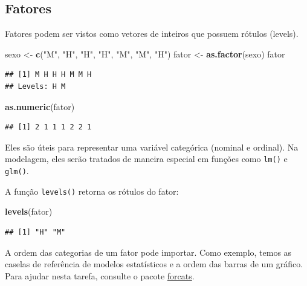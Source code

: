 \documentclass[
]{book}
\newenvironment{Shaded}{\begin{snugshade}}{\end{snugshade}}
\newcommand{\KeywordTok}[1]{\textcolor[rgb]{0.13,0.29,0.53}{\textbf{#1}}}
\newcommand{\NormalTok}[1]{#1}
\newcommand{\StringTok}[1]{\textcolor[rgb]{0.31,0.60,0.02}{#1}}
\begin{document}
\hypertarget{fatores}{%
\subsection{Fatores}\label{fatores}}

Fatores podem ser vistos como vetores de inteiros que possuem rótulos (levels).

\begin{Shaded}
\begin{Highlighting}[]
\NormalTok{sexo <{-}}\StringTok{ }\KeywordTok{c}\NormalTok{(}\StringTok{"M"}\NormalTok{, }\StringTok{"H"}\NormalTok{, }\StringTok{"H"}\NormalTok{, }\StringTok{"H"}\NormalTok{, }\StringTok{"M"}\NormalTok{, }\StringTok{"M"}\NormalTok{, }\StringTok{"H"}\NormalTok{)}
\NormalTok{fator <{-}}\StringTok{ }\KeywordTok{as.factor}\NormalTok{(sexo)}
\NormalTok{fator}
\end{Highlighting}
\end{Shaded}

\begin{verbatim}
## [1] M H H H M M H
## Levels: H M
\end{verbatim}

\begin{Shaded}
\begin{Highlighting}[]
\KeywordTok{as.numeric}\NormalTok{(fator)}
\end{Highlighting}
\end{Shaded}

\begin{verbatim}
## [1] 2 1 1 1 2 2 1
\end{verbatim}

Eles são úteis para representar uma variável categórica (nominal e ordinal). Na modelagem, eles serão tratados de maneira especial em funções como \texttt{lm()} e \texttt{glm()}.

A função \texttt{levels()} retorna os rótulos do fator:

\begin{Shaded}
\begin{Highlighting}[]
\KeywordTok{levels}\NormalTok{(fator)}
\end{Highlighting}
\end{Shaded}

\begin{verbatim}
## [1] "H" "M"
\end{verbatim}

A ordem das categorias de um fator pode importar. Como exemplo, temos as caselas de referência de modelos estatísticos e a ordem das barras de um gráfico. Para ajudar nesta tarefa, consulte o pacote \href{https://github.com/tidyverse/forcats}{forcats}.
\end{document}
